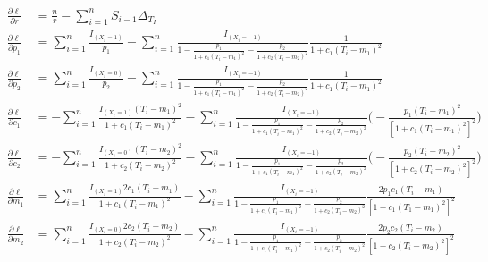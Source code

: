 \documentclass[11pt]{article}
\begin{document}
\begin{equation}
    \begin{split}
        \frac{\partial \ell}{\partial r} & = \frac{n}{r} - \sum_{i=1}^nS_{i-1} \Delta_{T_I} \\
        \frac{\partial \ell}{\partial p_1} & = \sum_{i=1}^n \frac{I_{(X_i = 1)}}{p_1} - \sum_{i=1}^n \frac{I_{(X_i = -1)}}{1-\frac{p_1}{1+c_1(T_i-m_1)^2} - \frac{p_2}{1+c_2(T_i-m_2)^2}}\frac{1}{1+c_1(T_i-m_1)^2}\\
        \frac{\partial \ell}{\partial p_2} & = \sum_{i=1}^n \frac{I_{(X_i = 0)}}{p_2} - \sum_{i=1}^n \frac{I_{(X_i = -1)}}{1-\frac{p_1}{1+c_1(T_i-m_1)^2} - \frac{p_2}{1+c_2(T_i-m_2)^2}}\frac{1}{1+c_1(T_i-m_1)^2}\\
        \frac{\partial \ell}{\partial c_1} & = - \sum_{i=1}^n \frac{I_{(X_i = 1)} (T_i -m_1)^2}{1+c_1(T_i-m_1)^2}- \sum_{i=1}^n \frac{I_{(X_i = -1)}}{1-\frac{p_1}{1+c_1(T_i-m_1)^2} - \frac{p_2}{1+c_2(T_i-m_2)^2}} \Big( - \frac{p_1(T_i-m_1)^2}{[1+c_1(T_i-m_1)^2]^2}\Big)\\
        \frac{\partial \ell}{\partial c_2} & = - \sum_{i=1}^n \frac{I_{(X_i = 0)} (T_i -m_2)^2}{1+c_2(T_i-m_2)^2} - \sum_{i=1}^n \frac{I_{(X_i = -1)}}{1-\frac{p_1}{1+c_1(T_i-m_1)^2} - \frac{p_2}{1+c_2(T_i-m_2)^2}}\Big( - \frac{p_2(T_i-m_2)^2}{[1+c_2(T_i-m_2)^2]^2}\Big) \\
        \frac{\partial \ell}{\partial m_1} & = \sum_{i=1}^n \frac{I_{(X_i = 1)} 2c_1 (T_i -m_1)}{1+c_1(T_i-m_1)^2}- \sum_{i=1}^n \frac{I_{(X_i = -1)}}{1-\frac{p_1}{1+c_1(T_i-m_1)^2} - \frac{p_2}{1+c_2(T_i-m_2)^2}} \frac{2p_1 c_1(T_i-m_1)}{[1+ c_1(T_1-m_1)^2]^2}\\
        \frac{\partial \ell}{\partial m_2} & = \sum_{i=1}^n \frac{I_{(X_i = 0)} 2c_2(T_i -m_2)}{1+c_2(T_i-m_2)^2}- \sum_{i=1}^n \frac{I_{(X_i = -1)}}{1-\frac{p_1}{1+c_1(T_i-m_1)^2} - \frac{p_2}{1+c_2(T_i-m_2)^2}}\frac{2p_2 c_2(T_i-m_2)}{[1+ c_2(T_i-m_2)^2]^2}
    \end{split}
\end{equation}


\end{document}
